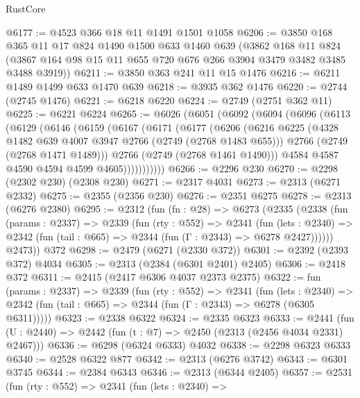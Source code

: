\begin{lexlean}{RustCore}
\begin{coremodule}
@6177 := @4523 @366 @18 @11 @1491 @1501 @1058
@6206 := @3850
    @168
    @365
    @11
    @17
    @824
    @1490
    @1500
    @633
    @1460
    @639
    (@3862
      @168
      @11
      @824
      (@3867 @164 @98 @15 @11 @655 @720 @676 @266 @3904 @3479 @3482 @3485 @3488 @3919))
@6211 := @3850 @363 @241 @11 @15 @1476
@6216 := @6211 @1489 @1499 @633 @1470 @639
@6218 := @3935 @362 @1476
@6220 := @2744 (@2745 @1476)
@6221 := @6218 @6220
@6224 := @2749 (@2751 @362 @11)
@6225 := @6221 @6224
@6265 := @6026
    (@6051
      (@6092
        (@6094
          (@6096
            (@6113
              (@6129
                (@6146
                  (@6159
                    (@6167
                      (@6171
                        (@6177
                          (@6206
                            (@6216
                              @6225
                              (@4328 @1482 @639 @4007 @3947 @2766 (@2749 (@2768 @1483 @655)))
                              @2766
                              (@2749 (@2768 @1471 @1489)))
                            @2766
                            (@2749 (@2768 @1461 @1490)))
                          @4584
                          @4587
                          @4590
                          @4594
                          @4599
                          @4605)))))))))))
@6266 := @2296 @230
@6270 := @2298 (@2302 @230) (@2308 @230)
@6271 := @2317 @4031
@6273 := @2313 (@6271 @2332)
@6275 := @2355 (@2356 @230)
@6276 := @2351 @6275
@6278 := @2313 (@6276 @2380)
@6295 := @2312
    (fun (fn : @28) =>
    @6273
      (@2335
        (@2338
          (fun (params : @2337) =>
          @2339
            (fun (rty : @552) =>
            @2341
              (fun (lets : @2340) =>
              @2342 (fun (tail : @665) => @2344 (fun (Γ : @2343) => @6278 @2427))))))
        @2473))
    @372
@6298 := @2479 (@6271 (@2330 @372))
@6301 := @2392 (@2393 @372) @4034
@6305 := @2313 (@2384 (@6301 @2401) @2405)
@6306 := @2418 @372
@6311 := @2415 (@2417 @6306 @4037 @2373 @2375)
@6322 := fun (params : @2337) =>
  @2339
    (fun (rty : @552) =>
    @2341
      (fun (lets : @2340) =>
      @2342 (fun (tail : @665) => @2344 (fun (Γ : @2343) => @6278 (@6305 @6311)))))
@6323 := @2338 @6322
@6324 := @2335 @6323
@6333 := @2441 (fun (U : @2440) => @2442 (fun (t : @7) => @2450 (@2313 (@2456 @4034 @2331) @2467)))
@6336 := @6298 (@6324 @6333) @4032
@6338 := @2298 @6323 @6333
@6340 := @2528 @6322 @877
@6342 := @2313 (@6276 @3742)
@6343 := @6301 @3745
@6344 := @2384 @6343
@6346 := @2313 (@6344 @2405)
@6357 := @2531
    (fun (rty : @552) =>
    @2341
      (fun (lets : @2340) =>

\end{coremodule}
\end{lexlean}
